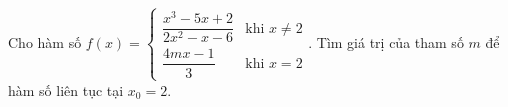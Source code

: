 \begin{ex}
Cho hàm số $f(x)=\begin{cases}\dfrac{x^3-5x+2}{2x^2-x-6}&\text{khi }x\ne2\\\dfrac{4mx-1}3&\text{khi }x=2\end{cases}$. Tìm giá trị của tham số $m$ để hàm số liên tục tại $x_0=2$.
\end{ex}
